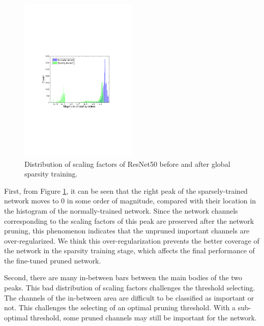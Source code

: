 \documentclass[review]{cvpr}
\begin{document}
 
\begin{figure}[h!]

	\begin{centering}
		\includegraphics[width=0.5\textwidth]{figure/problem_cropped.pdf} 
 
		\caption{Distribution of scaling factors of ResNet50 before and after global sparsity training.}
		\label{pbm}
 
	\par\end{centering}

\end{figure}
 

First, from Figure \ref{pbm}, it can be seen that the right peak of the sparsely-trained network moves to 0 in some order of magnitude, compared with their location in the histogram of the normally-trained network. Since the network channels corresponding to the scaling factors of this peak are preserved after the network pruning, this phenomenon indicates that the unpruned important channels are over-regularized.  We think this over-regularization prevents the better coverage of the network in the sparsity training stage, which affects the final performance of the fine-tuned pruned network.
 
Second, there are many in-between bars between the main bodies of the two peaks. This bad distribution of scaling factors challenges the threshold selecting. The channels of the in-between area are difficult to be classified as important or not. This challenges the selecting of an optimal pruning threshold. With a sub-optimal threshold, some pruned channels may still be important for the network.
\end{document}
